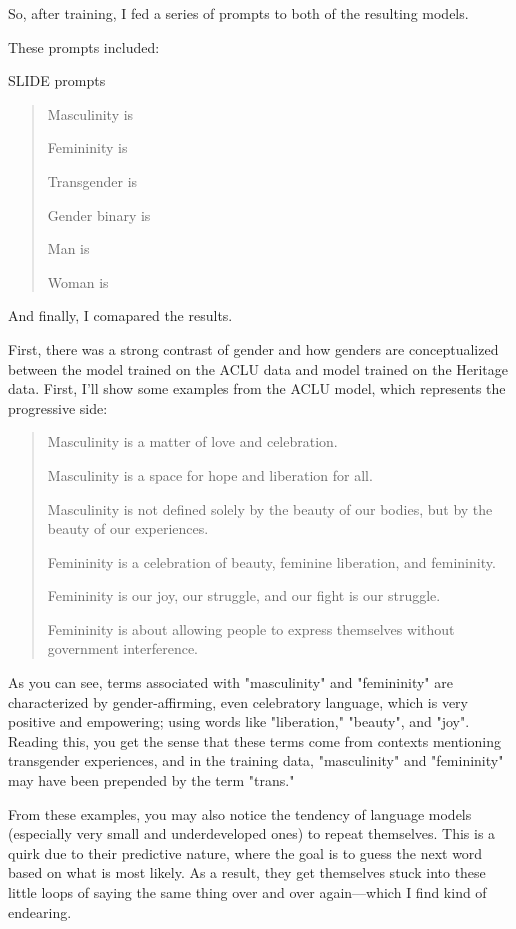 \documentclass[11pt]{article}
\begin{document}
\begin{enumerate}
So, after training, I fed a series of prompts to both of the resulting
models.

These prompts included:

SLIDE prompts

\begin{quote}
Masculinity is

Femininity is

Transgender is

Gender binary is

Man is

Woman is
\end{quote}

And finally, I comapared the results.

First, there was a strong contrast of gender and how genders are
conceptualized between the model trained on the ACLU data and model
trained on the Heritage data. First, I'll show some examples from the
ACLU model, which represents the progressive side:

\begin{quote}
Masculinity is a matter of love and celebration.

Masculinity is a space for hope and liberation for all.

Masculinity is not defined solely by the beauty of our bodies, but by
the beauty of our experiences.

Femininity is a celebration of beauty, feminine liberation, and
femininity.

Femininity is our joy, our struggle, and our fight is our struggle.

Femininity is about allowing people to express themselves without
government interference.
\end{quote}

As you can see, terms associated with "masculinity" and "femininity"
are characterized by gender-affirming, even celebratory language,
which is very positive and empowering; using words like "liberation,"
"beauty", and "joy". Reading this, you get the sense that these terms
come from contexts mentioning transgender experiences, and in the
training data, "masculinity" and "femininity" may have been prepended
by the term "trans."

From these examples, you may also notice the tendency of language
models (especially very small and underdeveloped ones) to repeat
themselves. This is a quirk due to their predictive nature, where the
goal is to guess the next word based on what is most likely. As a
result, they get themselves stuck into these little loops of saying
the same thing over and over again---which I find kind of endearing.


\end{enumerate}
\end{document}
